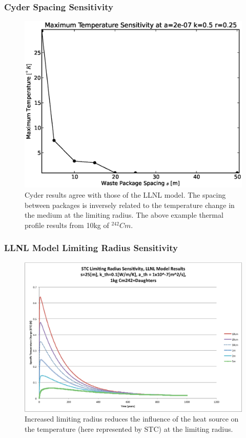 \begin{frame}[ctb!]
\frametitle{Cyder Spacing Sensitivity}
\begin{figure}[htbp!]
\begin{center}
\includegraphics[height=0.7\textheight]{./thermal_demonstration/spacing/spacing.eps}
\end{center}
\caption[Spacing Sensitivity in Cyder]
{Cyder results agree with those of the LLNL model. The spacing between packages 
is inversely related to the temperature change in the medium at the limiting 
radius. The above example thermal profile results from 10kg of $^{242}Cm$.}
\label{fig:rs}
\end{figure}
\end{frame}

\begin{frame}[ctb!]
\frametitle{LLNL Model Limiting Radius Sensitivity}
\begin{figure}[htbp!]
\begin{center}
\includegraphics[height=0.7\textheight]{./thermal_demonstration/spacing/Cm242r_lim_sens.eps}
\end{center}
\caption[$K_{th}$ Sensitivity to $r_{lim}$]{Increased limiting radius 
reduces the influence of the heat source on the temperature 
(here represented by STC) at the limiting radius.}
\label{fig:Cm242r_lim_sens}
\end{figure}
\end{frame}

